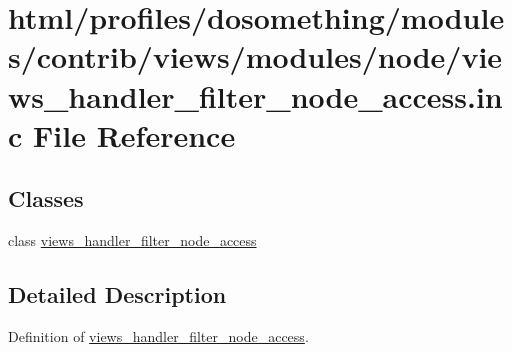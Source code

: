 \hypertarget{views__handler__filter__node__access_8inc}{
\section{html/profiles/dosomething/modules/contrib/views/modules/node/views\_\-handler\_\-filter\_\-node\_\-access.inc File Reference}
\label{views__handler__filter__node__access_8inc}
}
\subsection*{Classes}
\begin{DoxyCompactItemize}
\item 
class \hyperlink{classviews__handler__filter__node__access}{views\_\-handler\_\-filter\_\-node\_\-access}
\end{DoxyCompactItemize}


\subsection{Detailed Description}
Definition of \hyperlink{classviews__handler__filter__node__access}{views\_\-handler\_\-filter\_\-node\_\-access}. 
